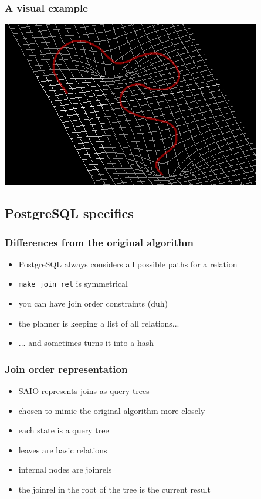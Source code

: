 \documentclass{beamer}
\begin{document}
\begin{frame}
  \frametitle{A visual example}
  \includegraphics[width=\textwidth]{curve.png}
\end{frame}

\subsection{PostgreSQL specifics}

\begin{frame}
  \frametitle{Differences from the original algorithm}

  \begin{itemize}
  \item PostgreSQL always considers all possible paths for a relation
  \item \texttt{make\_join\_rel} is symmetrical
  \item you can have join order constraints (duh)
  \item the planner is keeping a list of all relations...
  \item ... and sometimes turns it into a hash
  \end{itemize}
\end{frame}

\begin{frame}
  \frametitle{Join order representation}

  \begin{itemize}
  \item SAIO represents joins as \alert{query trees}
  \item chosen to mimic the original algorithm more closely
  \item each state is a query tree
  \item leaves are basic relations
  \item internal nodes are joinrels
  \item the joinrel in the root of the tree is the current result
  \end{itemize}
\end{frame}
\end{document}
